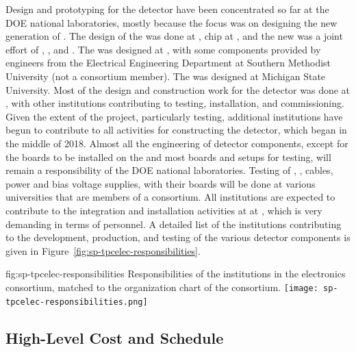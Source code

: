 Design and prototyping for the   detector have been 
concentrated so far at the DOE national laboratories, mostly because the 
focus was on designing the new generation of . The design 
of the  was done at ,  
chip at , and the new  was a joint effort of 
, , and . The  
 was designed at , with some components 
provided by engineers from the Electrical Engineering Department
at Southern Methodist University (not a consortium member).
The  was designed at Michigan State University.
Most of the design and construction work for the  detector 
was done at , with other institutions contributing to 
testing, installation, and commissioning. Given the extent of the project, 
particularly testing, additional institutions have begun to contribute
to all activities for constructing the  detector, which began 
in the middle of 2018. Almost all the engineering of detector components, 
except for the boards to be installed on the  and most boards 
and setups for testing, will remain a responsibility
of the DOE national laboratories. Testing of 
, , cables, power and bias voltage supplies,
 with their boards will be done at various
universities that are members of a consortium. All institutions
are expected to contribute to the integration and installation activities at
at , which is very
demanding in terms of personnel. A detailed list of the 
institutions contributing to the development, production, and
testing of the various detector components is given in Figure~\ref{fig:sp-tpcelec-responsibilities}.

\begin{dunefigure}
{fig:sp-tpcelec-responsibilities}
{Responsibilities of the institutions in the  electronics 
consortium, matched to the organization chart of the consortium.}
\texttt{[image: sp-tpcelec-responsibilities.png]}
\end{dunefigure}

\subsection{High-Level Cost and Schedule}
\label{sec:fdsp-tpcelec-management-cost}

